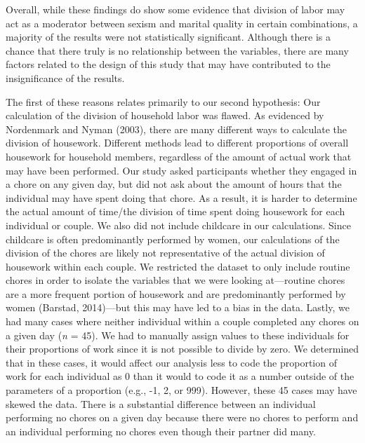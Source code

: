 \documentclass[
  man]{apa6}
\begin{document}
Overall, while these findings do show some evidence that division of labor may act as a moderator between sexism and marital quality in certain combinations, a majority of the results were not statistically significant. Although there is a chance that there truly is no relationship between the variables, there are many factors related to the design of this study that may have contributed to the insignificance of the results.

The first of these reasons relates primarily to our second hypothesis: Our calculation of the division of household labor was flawed. As evidenced by Nordenmark and Nyman (2003), there are many different ways to calculate the division of housework. Different methods lead to different proportions of overall housework for household members, regardless of the amount of actual work that may have been performed. Our study asked participants whether they engaged in a chore on any given day, but did not ask about the amount of hours that the individual may have spent doing that chore. As a result, it is harder to determine the actual amount of time/the division of time spent doing housework for each individual or couple. We also did not include childcare in our calculations. Since childcare is often predominantly performed by women, our calculations of the division of the chores are likely not representative of the actual division of housework within each couple. We restricted the dataset to only include routine chores in order to isolate the variables that we were looking at---routine chores are a more frequent portion of housework and are predominantly performed by women (Barstad, 2014)---but this may have led to a bias in the data. Lastly, we had many cases where neither individual within a couple completed any chores on a given day (\emph{n} = 45). We had to manually assign values to these individuals for their proportions of work since it is not possible to divide by zero. We determined that in these cases, it would affect our analysis less to code the proportion of work for each individual as 0 than it would to code it as a number outside of the parameters of a proportion (e.g., -1, 2, or 999). However, these 45 cases may have skewed the data. There is a substantial difference between an individual performing no chores on a given day because there were no chores to perform and an individual performing no chores even though their partner did many.
\end{document}
